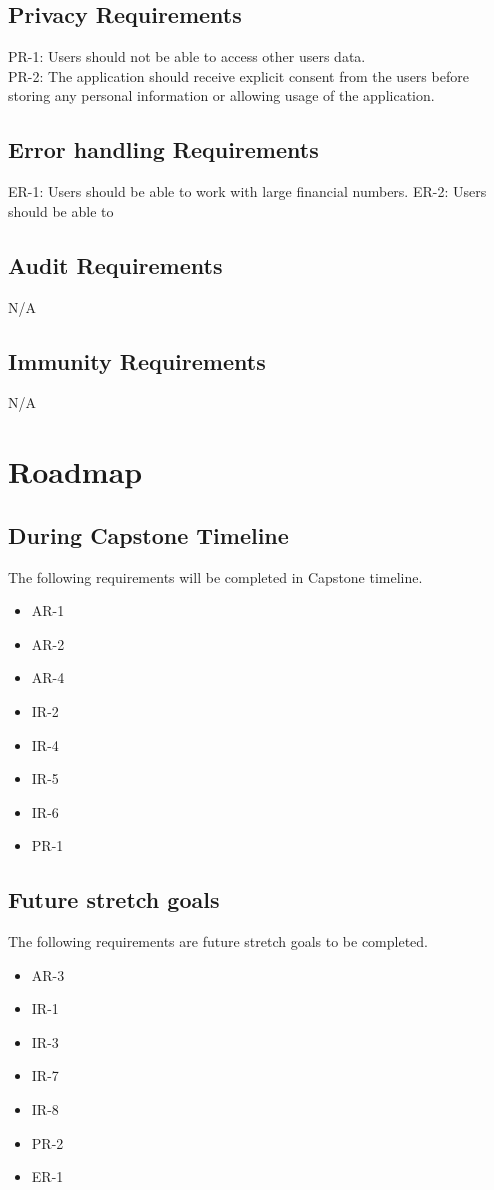 \documentclass{article}
\begin{document}
\subsection{Privacy Requirements}
PR-1: Users should not be able to access other users data. \\
PR-2: The application should receive explicit consent from the users before storing any personal information or allowing usage of the application.

\subsection{Error handling Requirements}
ER-1: Users should be able to work with large financial numbers.
ER-2: Users should be able to 

\subsection{Audit Requirements}
N/A

\subsection{Immunity Requirements}
N/A


\section{Roadmap}

\subsection{During Capstone Timeline}
The following requirements will be completed in Capstone timeline.
\begin{itemize}
    \item AR-1
    \item AR-2
    \item AR-4
    \item IR-2
    \item IR-4
    \item IR-5
    \item IR-6
    \item PR-1
\end{itemize}
\subsection{Future stretch goals}
The following requirements are future stretch goals to be completed.
\begin{itemize}
    \item AR-3
    \item IR-1
    \item IR-3
    \item IR-7
    \item IR-8
    \item PR-2
    \item ER-1
\end{itemize}

\end{document}
